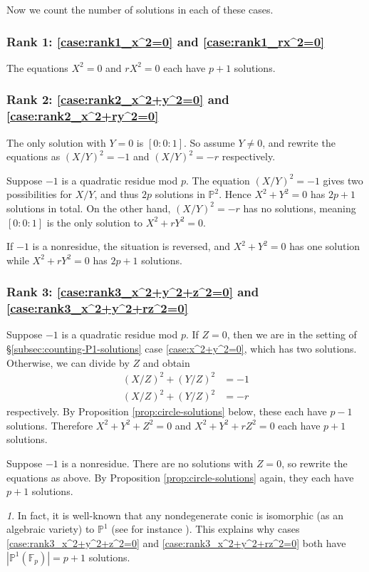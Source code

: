 \documentclass[10pt,a4paper]{amsart}
\numberwithin{equation}{section}
\numberwithin{figure}{section}
\theoremstyle{definition}
\theoremstyle{remark}
\newtheorem*{rem*}{\protect\remarkname}
\theoremstyle{plain}
\theoremstyle{plain}
\theoremstyle{definition}
\theoremstyle{plain}
\theoremstyle{plain}
\providecommand{\remarkname}{Remark}
\renewcommand{\P}{\mathbb{P}}
\newcommand{\F}{\mathbb{F}}
\begin{document}
	Now we count the number of solutions in each of these cases.
	
	\subsubsection*{Rank 1: \eqref{case:rank1_x^2=0} and \eqref{case:rank1_rx^2=0}} 
	The equations $X^2 = 0$ and $rX^2 = 0$ each have $p + 1$ solutions.
	
	\subsubsection*{Rank 2: \eqref{case:rank2_x^2+y^2=0} and \eqref{case:rank2_x^2+ry^2=0}} 
	The only solution with $Y=0$ is $[0:0:1]$. So assume $Y \neq 0$, and rewrite the 
	equations as $(X/Y)^2 = -1$ and $(X/Y)^2 = -r$ respectively.
	
	Suppose $-1$ is a quadratic residue mod $p$. The equation $(X/Y)^2 = -1$ gives
	two possibilities for $X/Y$, and thus $2p$ solutions in $\mathbb{P}^2$. Hence
	$X^2 + Y^2 = 0$ has $2p + 1$ solutions in total. On the other hand, $(X/Y)^2 =
	-r$ has no solutions, meaning $[0:0:1]$ is the only solution to $X^2 + rY^2 =
	0$.
	
	If $-1$ is a nonresidue, the situation is reversed, and $X^2 + Y^2 = 0$ has one
	solution while $X^2 + rY^2 = 0$ has $2p + 1$ solutions.
	
	\subsubsection*{Rank 3: \eqref{case:rank3_x^2+y^2+z^2=0} and \eqref{case:rank3_x^2+y^2+rz^2=0}} 
	Suppose $-1$ is a quadratic residue mod $p$. If $Z = 0$, then we are in the setting of
	\S\ref{subsec:counting-P1-solutions} case \eqref{case:x^2+y^2=0}, which has two
	solutions. Otherwise, we can divide by $Z$ and obtain 
	\begin{align*} 
	(X/Z)^2 + (Y/Z)^2 &= -1 \\ 
	(X/Z)^2 + (Y/Z)^2 &= -r 
	\end{align*} 
	respectively. By Proposition \ref{prop:circle-solutions} below, these each have $p - 1$
	solutions. Therefore $X^2 + Y^2 + Z^2 = 0$ and $X^2 + Y^2 + rZ^2 = 0$ each have
	$p+1$ solutions.
	
	Suppose $-1$ is a nonresidue. There are no solutions with $Z=0$, so rewrite the
	equations as above. By Proposition \ref{prop:circle-solutions} again, they each
	have $p + 1$ solutions.

    \begin{rem*}
      In fact, it is well-known that any nondegenerate conic is isomorphic (as an algebraic variety) to $\P^1$ (see for instance \cite[Prop.~19.3.1]{vakil}). This explains why cases \eqref{case:rank3_x^2+y^2+z^2=0} and \eqref{case:rank3_x^2+y^2+rz^2=0} both have $|\P^1(\F_p)|=p+1$ solutions.
    \end{rem*}
	
\end{document}
